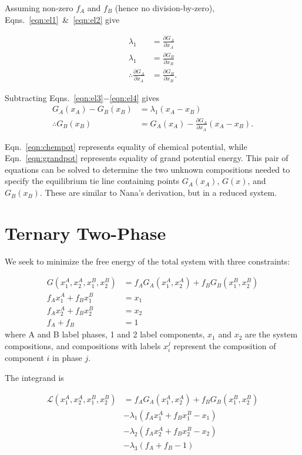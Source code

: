 \documentclass[10pt]{article}
\begin{document}
Assuming non-zero $f_A$ and $f_B$ (hence no division-by-zero), Eqns.~\ref{eqn:el1}~\&~\ref{eqn:el2} give

\begin{align}
  \lambda_1 &= \frac{\partial G_A}{\partial x_A}\\
  \lambda_1 &= \frac{\partial G_B}{\partial x_B}\\
  \label{eqn:chempot}
  \therefore \frac{\partial G_A}{\partial x_A} &= \frac{\partial G_B}{\partial x_B}.
\end{align}

Subtracting Eqns.~\ref{eqn:el3}$-$\ref{eqn:el4} gives
\begin{align}
  G_A(x_A) - G_B(x_B) &= \lambda_1(x_A - x_B)\\
  \label{eqn:grandpot}
  \therefore G_B(x_B) &= G_A(x_A) - \frac{\partial G_A}{\partial x_A}\left(x_A - x_B\right).
\end{align}

Eqn.~\ref{eqn:chempot} represents equality of chemical potential, while
Eqn.~\ref{eqn:grandpot} represents equality of grand potential energy. This pair
of equations can be solved to determine the two unknown compositions needed to
specify the equilibrium tie line containing points $G_A(x_A)$, $G(x)$, and
$G_B(x_B)$. These are similar to Nana's derivation, but in a reduced system.

\section*{Ternary Two-Phase}

We seek to minimize the free energy of the total system with three constraints:

\begin{align}
  G(x_1^A, x_2^A, x_1^B, x_2^B) &= f_A G_A(x_1^A,x_2^A) + f_B G_B(x_1^B, x_2^B)\\
  f_A x_1^A + f_B x_1^B &= x_1\\
  f_A x_2^A + f_B x_2^B &= x_2\\
  f_A + f_B &= 1
\end{align}
where A and B label phases, 1 and 2 label components, $x_1$ and $x_2$ are the system compositions,
and compositions with labels $x_i^j$ represent the composition of component $i$ in phase $j$.

The integrand is

\begin{align}
  \nonumber
  \mathcal{L}(x_1^A, x_2^A, x_1^B, x_2^B) &= f_A G_A(x_1^A, x_2^A) + f_B G_B(x_1^B, x_2^B)\\
  \nonumber
                                          &- \lambda_1(f_A x_1^A + f_B x_1^B - x_1)\\
  \nonumber
                                          &- \lambda_2(f_A x_2^A + f_B x_2^B - x_2)\\
                                          &- \lambda_3(f_A + f_B - 1)
\end{align}
\end{document}
